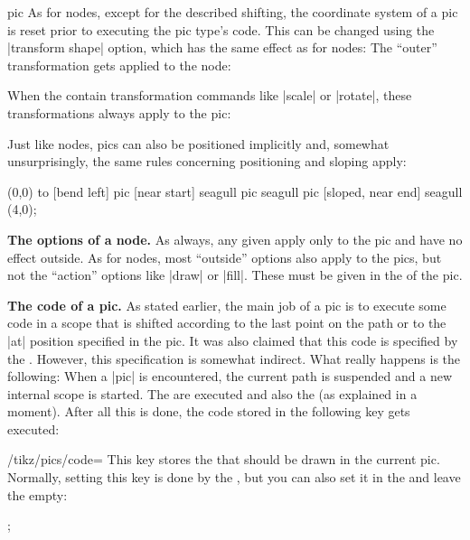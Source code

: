 \begin{pathoperation}{pic}
    As for nodes, except for the described shifting, the coordinate system of a
    pic is reset prior to executing the pic type's code. This can be changed
    using the |transform shape| option, which has the same effect as for nodes:
    The ``outer'' transformation gets applied to the node:
\begin{codeexample}[]
\end{codeexample}

    When the  contain transformation commands like |scale| or
    |rotate|, these transformations always apply to the pic:
\begin{codeexample}[]
\end{codeexample}

    Just like nodes, pics can also be positioned implicitly and, somewhat
    unsurprisingly, the same rules concerning positioning and sloping apply:
\begin{codeexample}[]
\tikz \draw
  (0,0) to [bend left]
           pic [near start]       {seagull}
           pic                    {seagull}
           pic [sloped, near end] {seagull} (4,0);
\end{codeexample}

    \medskip
    \textbf{The options of a node.}
    As always, any given  apply only to the pic and have no
    effect outside. As for nodes, most ``outside'' options also apply to the
    pics, but not the ``action'' options like |draw| or |fill|. These must be
    given in the  of the pic.

    \medskip
    \textbf{The code of a pic.}
    As stated earlier, the main job of a pic is to execute some code in a scope
    that is shifted according to the last point on the path or to the |at|
    position specified in the pic. It was also claimed that this code is
    specified by the . However, this specification is somewhat
    indirect. What really happens is the following: When a |pic| is
    encountered, the current path is suspended and a new internal scope is
    started. The  are executed and also the  (as
    explained in a moment). After all this is done, the code stored in the
    following key gets executed:

    \begin{key}{/tikz/pics/code=}
        This key stores the  that should be drawn in the current
        pic. Normally, setting this key is done by the , but you
        can also set it in the  and leave the 
        empty:
\begin{codeexample}[]
\tikz \pic [pics/code={\draw (-3mm,0) to[bend left] (0,0)
                                      to[bend left] (3mm,0);}]
      {}; %
\end{codeexample}
    \end{key}


\end{pathoperation}
